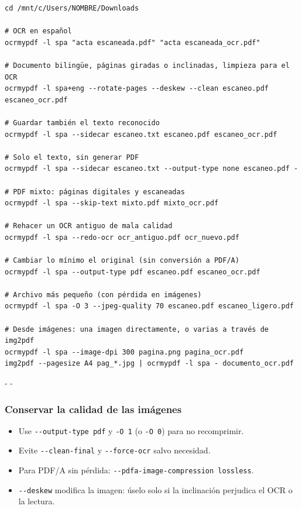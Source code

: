 \documentclass[11pt,a4paper]{article}
\makeatletter
\newcommand{\necesitaespacio}[1]{\par\penalty-100\begingroup
	\setlength{\dimen@}{#1}\dimen@ii\pagegoal\advance\dimen@ii-\pagetotal
	\ifdim\dimen@>\dimen@ii\ifdim\dimen@ii>\z@\vfil\fi\penalty-\@M\fi\endgroup}
\newcommand{\opt}[1]{\texttt{\textcolor{colopt}{#1}}}      %
\makeatother
\begin{document}
	\begin{lstlisting}
cd /mnt/c/Users/NOMBRE/Downloads

# OCR en español
ocrmypdf -l spa "acta escaneada.pdf" "acta escaneada_ocr.pdf"

# Documento bilingüe, páginas giradas o inclinadas, limpieza para el OCR
ocrmypdf -l spa+eng --rotate-pages --deskew --clean escaneo.pdf escaneo_ocr.pdf

# Guardar también el texto reconocido
ocrmypdf -l spa --sidecar escaneo.txt escaneo.pdf escaneo_ocr.pdf

# Solo el texto, sin generar PDF
ocrmypdf -l spa --sidecar escaneo.txt --output-type none escaneo.pdf -

# PDF mixto: páginas digitales y escaneadas
ocrmypdf -l spa --skip-text mixto.pdf mixto_ocr.pdf

# Rehacer un OCR antiguo de mala calidad
ocrmypdf -l spa --redo-ocr ocr_antiguo.pdf ocr_nuevo.pdf

# Cambiar lo mínimo el original (sin conversión a PDF/A)
ocrmypdf -l spa --output-type pdf escaneo.pdf escaneo_ocr.pdf

# Archivo más pequeño (con pérdida en imágenes)
ocrmypdf -l spa -O 3 --jpeg-quality 70 escaneo.pdf escaneo_ligero.pdf

# Desde imágenes: una imagen directamente, o varias a través de img2pdf
ocrmypdf -l spa --image-dpi 300 pagina.png pagina_ocr.pdf
img2pdf --pagesize A4 pag_*.jpg | ocrmypdf -l spa - documento_ocr.pdf
\end{lstlisting}
	
	\necesitaespacio{6\baselineskip}
	\subsubsection{Conservar la calidad de las imágenes}
	
	\begin{itemize}
		\item Use \opt{-{}-output-\allowbreak{}type pdf} y \opt{-O 1} (o \opt{-O 0}) para no recomprimir.
		\item Evite \opt{-{}-clean-final} y \opt{-{}-force-ocr} salvo necesidad.
		\item Para PDF/A sin pérdida: \opt{-{}-pdfa-\allowbreak{}image-\allowbreak{}compression lossless}.
		\item \opt{-{}-deskew} modifica la imagen: úselo solo si la inclinación perjudica el OCR o la lectura.
	\end{itemize}
	
\end{document}
